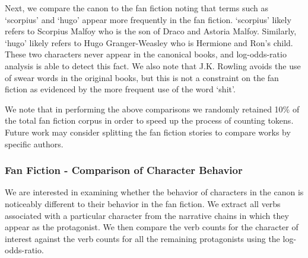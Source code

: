 Next, we compare the canon to the fan fiction noting that terms such as `scorpius' and `hugo' appear more frequently in the fan fiction. `scorpius' likely refers to Scorpius Malfoy who is the son of Draco and Astoria Malfoy. Similarly, `hugo' likely refers to Hugo Granger-Weasley who is Hermione and Ron's child. These two characters never appear in the canonical books, and log-odds-ratio analysis is able to detect this fact. We also note that J.K. Rowling avoids the use of swear words in the original books, but this is not a constraint on the fan fiction as evidenced by the more frequent use of the word `shit'.

We note that in performing the above comparisons we randomly retained 10\% of the total fan fiction corpus in order to speed up the process of counting tokens. Future work may consider splitting the fan fiction stories to compare works by specific authors.

\subsubsection{Fan Fiction - Comparison of Character Behavior} \label{character_odds}

We are interested in examining whether the behavior of characters in the canon is noticeably different to their behavior in the fan fiction. We extract all verbs associated with a particular character from the narrative chains in which they appear as the protagonist. We then compare the verb counts for the character of interest against the verb counts for all the remaining protagonists using the log-odds-ratio. 

\begin{table}[htbp]
\centering
{}
\caption{}
\label{tab:compare_actions}
\end{table}

